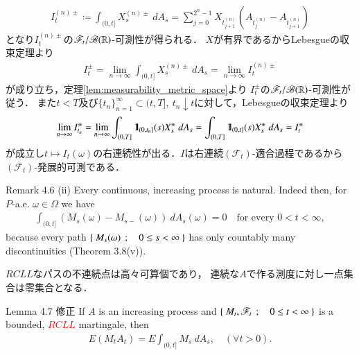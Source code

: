 \begin{prf}
\begin{align}
			I^{(n)\pm}_t \coloneqq \int_{(0,t]} X^{(n)\pm}_s\ dA_s
			= \sum_{j=0}^{2^n-1} X_{t^{(n)}_{j+1}} \left(A_{t^{(n)}_j} - A_{t^{(n)}_{j+1}}\right)
		\end{align}
		となり$I^{(n)\pm}_t$の$\mathscr{F}_t/\mathscr{B}(\mathbb{R})$-可測性が得られる．
		$X$が有界であるからLebesgueの収束定理より
		\begin{align}
			I^{\pm}_t = \lim_{n \to \infty} \int_{(0,t]} X^{(n)\pm}_s\ dA_s
			= \lim_{n \to \infty} I^{(n)\pm}_t
		\end{align}
		が成り立ち，定理\ref{lem:measurability_metric_space}より
		$I^{\pm}_t$の$\mathscr{F}_t/\mathscr{B}(\mathbb{R})$-可測性が従う．
		また$t<T$及び$\{t_n\}_{n=1}^\infty \subset (t,T],\ t_n \downarrow t$に対して，Lebesgueの収束定理より
		\begin{align}
			\lim_{n \to \infty} I^\pm_{t_n}
			= \lim_{n \to \infty} \int_{(0,T]} \mbox{1}\hspace{-0.25em}\mbox{l}_{(0,t_n]}(s)X^\pm_s\ dA_s
			= \int_{(0,T]} \mbox{1}\hspace{-0.25em}\mbox{l}_{(0,t]}(s)X^\pm_s\ dA_s
			= I^\pm_t
		\end{align}
		が成立し$t \longmapsto I_t(\omega)$の右連続性が出る．$I$は右連続$(\mathscr{F}_t)$-適合過程であるから
		$(\mathscr{F}_t)$-発展的可測である．
		\QED
	\end{prf}
	
	\begin{itembox}[l]{Remark 4.6 (ii)}
		Every continuous, increasing process is natural. Indeed then, for $P$-a.e. $\omega \in \Omega$
		we have
		\begin{align}
			\int_{(0,t]} (M_s(\omega)-M_{s-}(\omega))\ dA_s(\omega) = 0
			\quad \mbox{for every $0 < t < \infty$},
		\end{align}
		because every path $\left\{\ M_s(\omega)\ \, ; \quad 0 \leq s < \infty\ \right\}$ has only countably many discontinuities
		(Theorem 3.8(v)).
	\end{itembox}
	
	\begin{prf}
		$RCLL$なパスの不連続点は高々可算個であり，
		連続な$A$で作る測度に対し一点集合は零集合となる．
		\QED
	\end{prf}
	
	\begin{itembox}[l]{Lemma 4.7 修正}
		If $A$ is an increasing process and $\left\{\ M_t,\mathscr{F}_t\ \, ; \quad 0 \leq t < \infty\ \right\}$ is a bounded,
		\textcolor{red}{$RCLL$} martingale, then
		\begin{align}
			E(M_t A_t) = E \int_{(0,t]} M_s\ dA_s, \quad (\forall t > 0).
			\label{eq:chapter_1_lemma_4_7}
		\end{align}
	\end{itembox}
	
